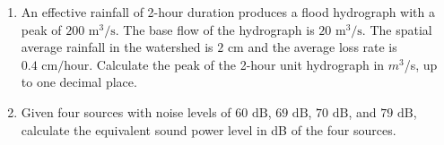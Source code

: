 \documentclass[journal]{IEEEtran}
\numberwithin{equation}{enumi}
\numberwithin{figure}{enumi}
\begin{document}
\begin{enumerate}[start=40]
\item
An effective rainfall of 2-hour duration produces a flood hydrograph with a peak of $200 \text{ m}^3/\text{s}$. The base flow of the hydrograph is $20 \text{ m}^3/\text{s}$. The spatial average rainfall in the watershed is $2 \text{ cm}$ and the average loss rate is $0.4 \text{ cm/hour}$. Calculate the peak of the 2-hour unit hydrograph in ${m}^3$/s, up to one decimal place.

\item
Given four sources with noise levels of $60 \text{ dB}$, $69 \text{ dB}$, $70 \text{ dB}$, and $79 \text{ dB}$, calculate the equivalent sound power level in dB of the four sources.


\end{enumerate}
\end{document}
